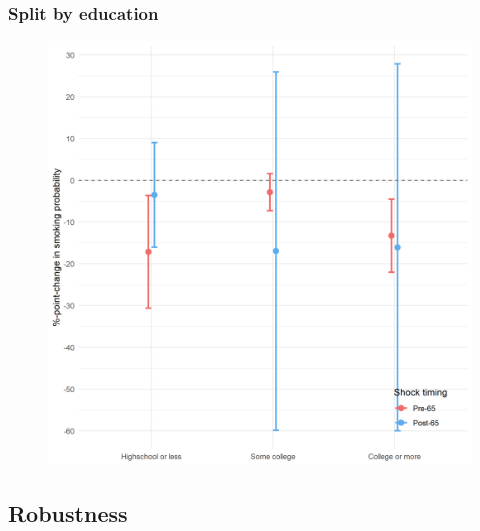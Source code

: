 \documentclass[10pt,compress,xcolor=dvipsnames]{beamer}    %
\newcounter{ex}
\newcommand{\1}[1]{\mathrm{1\hspace*{-2.5pt}l}[#1]}	%
\begin{document}
\begin{frame}
\frametitle{Split by education}

\begin{figure}[hbtp]
\centering
\includegraphics[height=0.8\textheight]{../../3_output/shock_effects/edu_6070_100_cvplot.png}
\label{fig:edu}
\end{figure}
\hyperlink{frame:otherX}{}
\end{frame}








\subsection{Robustness}
\end{document}
